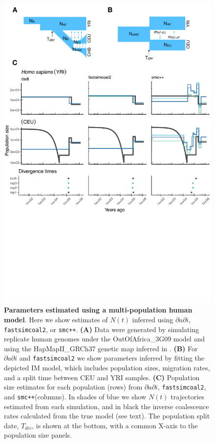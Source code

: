 \documentclass[12pt,halfline,a4paper]{ouparticle}
\newcommand{\dadi}{$\partial a \partial i$\xspace}
\newcommand{\smcpp}{\texttt{smc++}\xspace}
\newcommand{\fastsimcoal}{\texttt{fastsimcoal2}\xspace}
\begin{document}
\begin{figure}
\begin{center}
\includegraphics[width=0.7\linewidth]{display_items/homo_sapiens_two_popn_comp.pdf}
\caption{\textbf{Parameters estimated using a multi-population human model}.
Here we show estimates of $N(t)$ inferred using \dadi, \fastsimcoal, or \smcpp. \textbf{(A)} Data were generated by simulating
replicate human genomes under the OutOfAfrica\_3G09 model and using the HapMapII\_GRCh37 genetic map
inferred in \cite{international2007second}. \textbf{(B)} For \dadi and \fastsimcoal we show parameters inferred
by fitting the depicted IM model, which includes population sizes, migration rates, and a split
time between CEU and YRI samples. \textbf{(C)} Population size estimates for each population (rows)
from \dadi, \fastsimcoal, and \smcpp (columns).
In shades of blue we show $N(t)$ trajectories estimated from each simulation,
and in black the inverse coalescence rates calculated from the true model (see text).
The population split date, $T_{div}$, is shown at
the bottom, with a common X-axis to the population size panels.}
\label{fig:IM_popn_human}
\end{center}
\end{figure}
\end{document}
